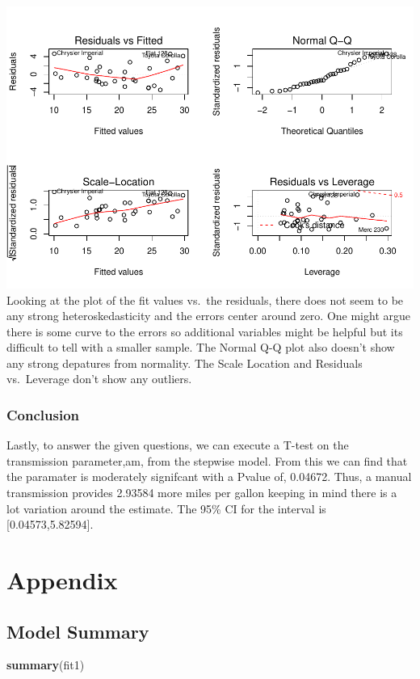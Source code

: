 \documentclass[]{article}
\newenvironment{Shaded}{\begin{snugshade}}{\end{snugshade}}
\newcommand{\KeywordTok}[1]{\textcolor[rgb]{0.13,0.29,0.53}{\textbf{{#1}}}}
\newcommand{\NormalTok}[1]{{#1}}
\begin{document}
\includegraphics{statproject_files/figure-latex/unnamed-chunk-6-1.pdf}
Looking at the plot of the fit values vs.~the residuals, there does not
seem to be any strong heteroskedasticity and the errors center around
zero. One might argue there is some curve to the errors so additional
variables might be helpful but its difficult to tell with a smaller
sample. The Normal Q-Q plot also doesn't show any strong depatures from
normality. The Scale Location and Residuals vs.~Leverage don't show any
outliers.

\subsubsection{Conclusion}\label{conclusion}

Lastly, to answer the given questions, we can execute a T-test on the
transmission parameter,am, from the stepwise model. From this we can
find that the paramater is moderately signifcant with a Pvalue of,
0.04672. Thus, a manual transmission provides 2.93584 more miles per
gallon keeping in mind there is a lot variation around the estimate. The
95\% CI for the interval is {[}0.04573,5.82594{]}.

\section{Appendix}\label{appendix}

\subsection{Model Summary}\label{model-summary}

\begin{Shaded}
\begin{Highlighting}[]
\KeywordTok{summary}\NormalTok{(fit1)}
\end{Highlighting}
\end{Shaded}
\end{document}
